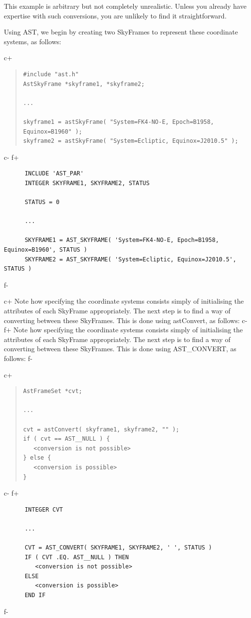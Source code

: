 \documentclass[twoside,11pt]{article}
\begin{document}
This example is arbitrary but not completely unrealistic. Unless you
already have expertise with such conversions, you are unlikely to find
it straightforward.

Using AST, we begin by creating two SkyFrames to represent these
coordinate systems, as follows:

c+
\begin{quote}
\small
\begin{verbatim}
#include "ast.h"
AstSkyFrame *skyframe1, *skyframe2;

...

skyframe1 = astSkyFrame( "System=FK4-NO-E, Epoch=B1958, Equinox=B1960" );
skyframe2 = astSkyFrame( "System=Ecliptic, Equinox=J2010.5" );
\end{verbatim}
\normalsize
\end{quote}
c-
f+
\small
\begin{verbatim}
      INCLUDE 'AST_PAR'
      INTEGER SKYFRAME1, SKYFRAME2, STATUS

      STATUS = 0

      ...

      SKYFRAME1 = AST_SKYFRAME( 'System=FK4-NO-E, Epoch=B1958, Equinox=B1960', STATUS )
      SKYFRAME2 = AST_SKYFRAME( 'System=Ecliptic, Equinox=J2010.5', STATUS )
\end{verbatim}
\normalsize
f-

c+
Note how specifying the coordinate systems consists simply of
initialising the attributes of each SkyFrame appropriately.  The next
step is to find a way of converting between these SkyFrames. This is
done using astConvert, as follows:
c-
f+
Note how specifying the coordinate systems consists simply of
initialising the attributes of each SkyFrame appropriately.  The next
step is to find a way of converting between these SkyFrames. This is
done using AST\_CONVERT, as follows:
f-

c+
\begin{quote}
\small
\begin{verbatim}
AstFrameSet *cvt;

...

cvt = astConvert( skyframe1, skyframe2, "" );
if ( cvt == AST__NULL ) {
   <conversion is not possible>
} else {
   <conversion is possible>
}
\end{verbatim}
\normalsize
\end{quote}
c-
f+
\small
\begin{verbatim}
      INTEGER CVT

      ...

      CVT = AST_CONVERT( SKYFRAME1, SKYFRAME2, ' ', STATUS )
      IF ( CVT .EQ. AST__NULL ) THEN
         <conversion is not possible>
      ELSE
         <conversion is possible>
      END IF
\end{verbatim}
\normalsize
f-
\end{document}
